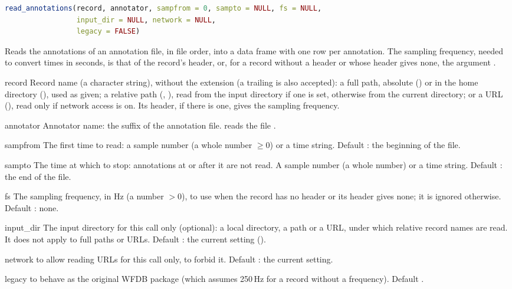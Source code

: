 \begin{lstlisting}[language=R,style=signature]
read_annotations(record, annotator, sampfrom = 0, sampto = NULL, fs = NULL,
                 input_dir = NULL, network = NULL,
                 legacy = FALSE)
\end{lstlisting}
Reads the annotations of an annotation file, in file order, into a data frame with one
row per annotation. The sampling frequency, needed to convert times in seconds, is that of
the record's header, or, for a record without a header or whose header gives none, the
argument .
\begin{params}
\item[record] Record name (a character string), without the  extension (a
  trailing  is also accepted): a full path, absolute
  () or in the home directory
  (), used as given; a relative path (,
  ), read from the input directory if one is set, otherwise from the
  current directory; or a URL (),
  read only if network access is on. Its header, if there is one, gives
  the sampling frequency.
\item[annotator] Annotator name: the suffix of the annotation file.  reads the
  file .
\item[sampfrom] The first time to read: a sample number (a whole number $\ge 0$) or a
  time string. Default : the beginning of the file.
\item[sampto] The time at which to stop: annotations at or after it are not read. A
  sample number (a whole number) or a time string. Default : the end of the
  file.
\item[fs] The sampling frequency, in Hz (a number $> 0$), to use when the record has no
  header or its header gives none; it is ignored otherwise. Default : none.
\item[input\_dir] The input directory for this call only (optional): a local directory, a
  \code{\textasciitilde} path or a URL, under which relative record names are read. It does not
  apply to full paths or URLs. Default : the current setting
  ().
\item[network]  to allow reading URLs for this call only,  to
  forbid it. Default : the current setting.
\item[legacy]  to behave as the original WFDB package (which assumes 250\,Hz
  for a record without a frequency). Default .
\end{params}
